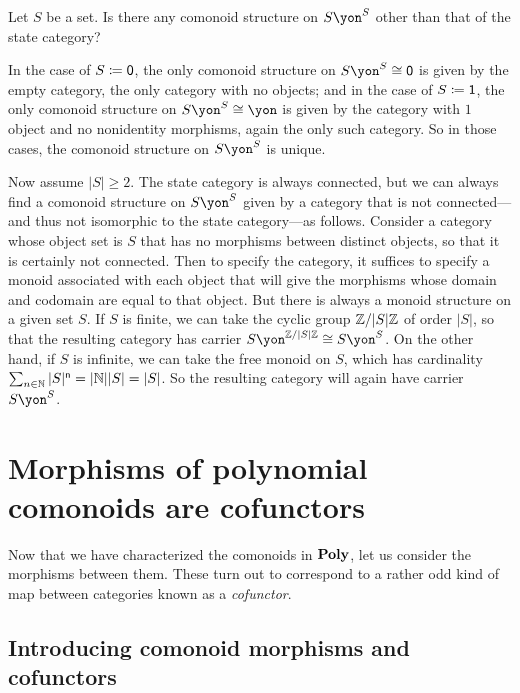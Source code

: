 \documentclass[Book-Poly]{subfiles}
\begin{document}
\begin{exercise} \label{exc.not_state_cat_but_same_carrier}
Let $S$ be a set. Is there any comonoid structure on $S\yon^S$ other than that of the state category?
\begin{solution}
In the case of $S\coloneqq\textsf{0}$, the only comonoid structure on $S\yon^S\iso\0$ is given by the empty category, the only category with no objects; and in the case of $S\coloneqq\textsf{1}$, the only comonoid structure on $S\yon^S\iso\yon$ is given by the category with $1$ object and no nonidentity morphisms, again the only such category.
So in those cases, the comonoid structure on $S\yon^S$ is unique.

Now assume $|S|\geq2$.
The state category is always connected, but we can always find a comonoid structure on $S\yon^S$ given by a category that is not connected---and thus not isomorphic to the state category---as follows.
Consider a category whose object set is $S$ that has no morphisms between distinct objects, so that it is certainly not connected.
Then to specify the category, it suffices to specify a monoid associated with each object that will give the morphisms whose domain and codomain are equal to that object.
But there is always a monoid structure on a given set $S$.
If $S$ is finite, we can take the cyclic group $\mathbb{Z}/|S|\mathbb{Z}$ of order $|S|$, so that the resulting category has carrier $S\yon^{\zz/|S|\zz}\iso S\yon^S$.
On the other hand, if $S$ is infinite, we can take the free monoid on $S$, which has cardinality $\sum_{n\in\mathbb{N}}|S|^{\mathsf{n}}=|\mathbb{N}||S|=|S|$.
So the resulting category will again have carrier $S\yon^S$.
\end{solution}
\end{exercise}


\section{Morphisms of polynomial comonoids are cofunctors}

Now that we have characterized the comonoids in $\mathbf{Poly}$, let us consider the morphisms between them.
These turn out to correspond to a rather odd kind of map between categories known as a \emph{cofunctor}.

\subsection{Introducing comonoid morphisms and cofunctors}
\end{document}
